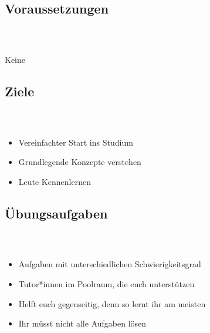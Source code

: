 \subsection{Voraussetzungen}
\begin{frame}
	\frametitle{\insertsectionhead \\ {\small \insertsubsectionhead}}
	\centering
	\vspace{2.5cm}
	\Huge Keine 
\end{frame}

\subsection{Ziele}
\begin{frame}
	\frametitle{\insertsectionhead \\ {\small \insertsubsectionhead}}
	\begin{itemize}
		\item Vereinfachter Start ins Studium
		\item Grundlegende Konzepte verstehen
		\item Leute Kennenlernen
		
	\end{itemize}
\end{frame}

\subsection{Übungsaufgaben}
\begin{frame}
	\frametitle{\insertsectionhead \\ {\small \insertsubsectionhead}}
	\begin{itemize}
		\item Aufgaben mit unterschiedlichen Schwierigkeitsgrad
		\item Tutor*innen im Poolraum, die euch unterstützen
		\item Helft euch gegenseitig, denn so lernt ihr am meisten
		\item Ihr müsst nicht alle Aufgaben lösen
	\end{itemize}
\end{frame}


